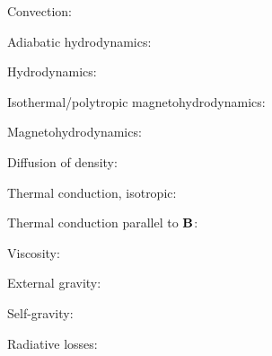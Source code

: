 \documentclass{article}
\newcommand{\BB}{{\bf B}}
\begin{document}
\LARGE

Convection:


Adiabatic hydrodynamics:


Hydrodynamics:


\newpage

Isothermal/polytropic magnetohydrodynamics:


Magnetohydrodynamics:


\newpage

Diffusion of density:


Thermal conduction, isotropic:


Thermal conduction parallel to $\BB$:


Viscosity:


External gravity:


Self-gravity:


Radiative losses:

\end{document}
